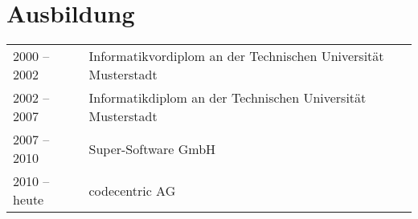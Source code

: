 \section*{Ausbildung}
\begin{longtable}{@{}p{6cm}p{10cm}}
2000 -- 2002	& Informatikvordiplom an der Technischen Universität Musterstadt\\
2002 -- 2007	& Informatikdiplom an der Technischen Universität Musterstadt\\
2007 -- 2010	& Super-Software GmbH\\
2010 -- heute	& codecentric AG
\end{longtable}

